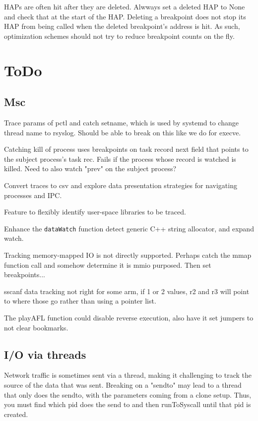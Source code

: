 \documentclass[titlepage]{article}
\begin{document}
\begin{appendices}
HAPs are often hit after they are deleted.  Alwways set a deleted HAP to None and check that at the start of the HAP.
Deleting a breakpoint does not stop its HAP from being called when the deleted breakpoint's address is hit.  As such,
optimization schemes should not try to reduce breakpoint counts on the fly.

\section{ToDo}
\subsection {Msc}
Trace params of pctl and catch setname, which is used by systemd to change thread name to rsyslog.  Should be able to 
break on this like we do for execve.

Catching kill of process uses breakpoints on task record next field that points to the subject process's task rec.  Fails if the
process whose record is watched is killed.  Need to also watch "prev" on the subject process?

Convert traces to csv and explore data presentation strategies for navigating processes and IPC.

Feature to flexibly identify user-space libraries to be traced.

Enhance the {\tt dataWatch} function detect generic C++ string allocator, and expand watch.

Tracking memory-mapped IO is not directly supported.  Perhaps catch the mmap function call and somehow determine it is mmio purposed.  Then
set breakpoints...

sscanf data tracking not right for some arm, if 1 or 2 values, r2 and r3 will point to where those go rather than using a pointer list.

The playAFL function could disable reverse execution, also have it set jumpers to not clear bookmarks.

\subsection{I/O via threads}
Network traffic is sometimes sent via a thread, making it challenging to track the source of the data that was sent.  Breaking on a "sendto" may
lead to a thread that only does the sendto, with the parameters coming from a clone setup.  Thus, you must find which pid does the send to and then
runToSyscall until that pid is created.


\end{appendices}
\end{document}
